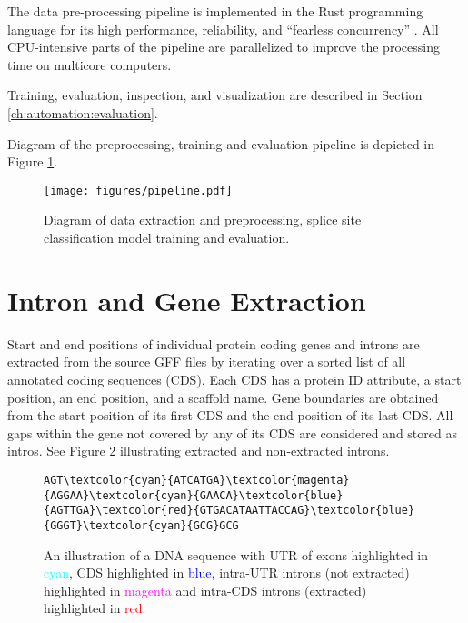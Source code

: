 The data pre-processing pipeline is implemented in the Rust programming
language for its high performance, reliability, and ``fearless concurrency''
\cite{matsakis2014rust}\cite{rust-web}. All CPU-intensive parts of the pipeline
are parallelized to improve the processing time on multicore computers.

Training, evaluation, inspection, and visualization are described in Section
\ref{ch:automation:evaluation}.

Diagram of the preprocessing, training and evaluation pipeline is depicted in
Figure \ref{fig:automation:pipeline}.

\begin{figure}
  \centering
  \texttt{[image: figures/pipeline.pdf]}
  \caption{Diagram of data extraction and preprocessing, splice site
    classification model training and evaluation.}
  \label{fig:automation:pipeline}
\end{figure}

\section{\label{ch:automation:features}Intron and Gene Extraction}

Start and end positions of individual protein coding genes and introns are
extracted from the source GFF files by iterating over a sorted list of all
annotated coding sequences (CDS). Each CDS has a protein ID attribute, a start
position, an end position, and a scaffold name. Gene boundaries are obtained
from the start position of its first CDS and the end position of its last CDS.
All gaps within the gene not covered by any of its CDS are considered and
stored as intros. See Figure \ref{fig:automation:color-coded} illustrating
extracted and non-extracted introns.

\begin{figure}
\centering
\begin{BVerbatim}[commandchars=\\\{\}]
AGT\textcolor{cyan}{ATCATGA}\textcolor{magenta}{AGGAA}\textcolor{cyan}{GAACA}\textcolor{blue}{AGTTGA}\textcolor{red}{GTGACATAATTACCAG}\textcolor{blue}{GGGT}\textcolor{cyan}{GCG}GCG
\end{BVerbatim}
\caption{An illustration of a DNA sequence with UTR of exons highlighted in
  \textcolor{cyan}{cyan}, CDS highlighted in \textcolor{blue}{blue}, intra-UTR
  introns (not extracted) highlighted in \textcolor{magenta}{magenta} and
  intra-CDS introns (extracted) highlighted in \textcolor{red}{red}.}
\label{fig:automation:color-coded}
\end{figure}

